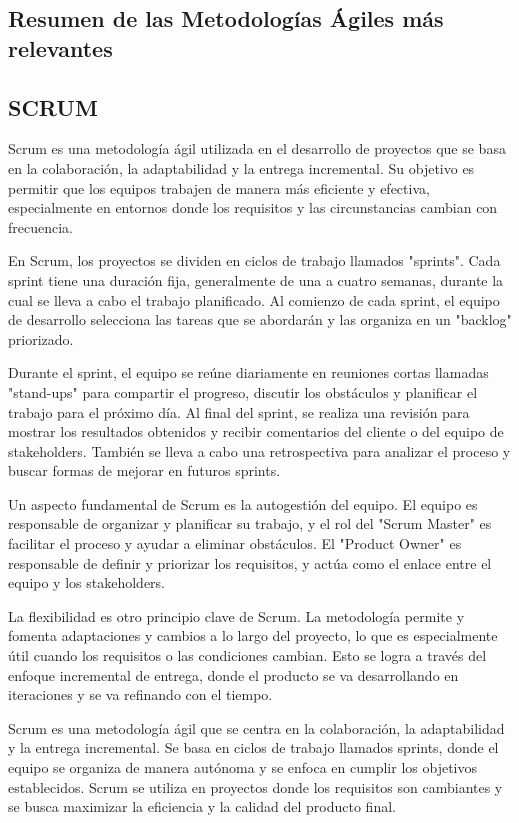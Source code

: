 \documentclass[12pt,a4paper]{article}
\newcommand{\espacio}{\par\vspace{3mm}}
\newcommand{\newsubsection}[1]{\subsection{\hspace{4mm} #1}}
\begin{document}
\newsubsection{Resumen de las Metodologías Ágiles más relevantes}
\subsection*{SCRUM}
\espacio Scrum es una metodología ágil utilizada en el desarrollo de proyectos que se basa en la colaboración, la adaptabilidad y la entrega incremental. Su objetivo es permitir que los equipos trabajen de manera más eficiente y efectiva, especialmente en entornos donde los requisitos y las circunstancias cambian con frecuencia.
\espacio En Scrum, los proyectos se dividen en ciclos de trabajo llamados "sprints". Cada sprint tiene una duración fija, generalmente de una a cuatro semanas, durante la cual se lleva a cabo el trabajo planificado. Al comienzo de cada sprint, el equipo de desarrollo selecciona las tareas que se abordarán y las organiza en un "backlog" priorizado.
\espacio Durante el sprint, el equipo se reúne diariamente en reuniones cortas llamadas "stand-ups" para compartir el progreso, discutir los obstáculos y planificar el trabajo para el próximo día. Al final del sprint, se realiza una revisión para mostrar los resultados obtenidos y recibir comentarios del cliente o del equipo de stakeholders. También se lleva a cabo una retrospectiva para analizar el proceso y buscar formas de mejorar en futuros sprints.
\espacio Un aspecto fundamental de Scrum es la autogestión del equipo. El equipo es responsable de organizar y planificar su trabajo, y el rol del "Scrum Master" es facilitar el proceso y ayudar a eliminar obstáculos. El "Product Owner" es responsable de definir y priorizar los requisitos, y actúa como el enlace entre el equipo y los stakeholders.
\espacio La flexibilidad es otro principio clave de Scrum. La metodología permite y fomenta adaptaciones y cambios a lo largo del proyecto, lo que es especialmente útil cuando los requisitos o las condiciones cambian. Esto se logra a través del enfoque incremental de entrega, donde el producto se va desarrollando en iteraciones y se va refinando con el tiempo.
\espacio Scrum es una metodología ágil que se centra en la colaboración, la adaptabilidad y la entrega incremental. Se basa en ciclos de trabajo llamados sprints, donde el equipo se organiza de manera autónoma y se enfoca en cumplir los objetivos establecidos. Scrum se utiliza en proyectos donde los requisitos son cambiantes y se busca maximizar la eficiencia y la calidad del producto final.
\end{document}
